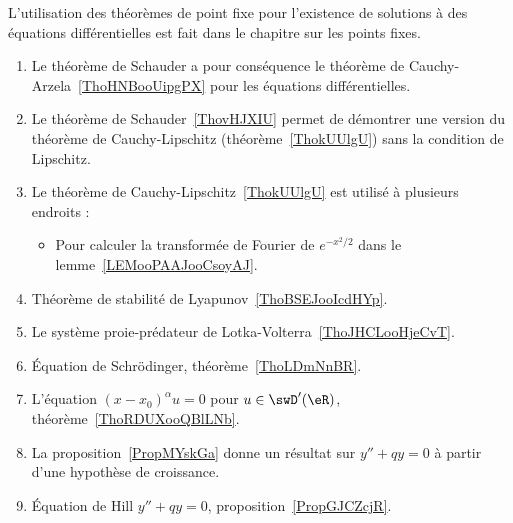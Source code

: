 
	\label{THEMEooEquaDiff}
L'utilisation des théorèmes de point fixe pour l'existence de solutions à des équations différentielles est fait dans le chapitre sur les points fixes.
\begin{enumerate}
	\item
	      Le théorème de Schauder a pour conséquence le théorème de Cauchy-Arzela~\ref{ThoHNBooUipgPX} pour les équations différentielles.
	\item
	      Le théorème de Schauder~\ref{ThovHJXIU} permet de démontrer une version du théorème de Cauchy-Lipschitz (théorème~\ref{ThokUUlgU}) sans la condition de Lipschitz.
	\item
	      Le théorème de Cauchy-Lipschitz~\ref{ThokUUlgU} est utilisé à plusieurs endroits :
	      \begin{itemize}
		      \item
		            Pour calculer la transformée de Fourier de \(  e^{-x^2/2}\) dans le lemme~\ref{LEMooPAAJooCsoyAJ}.
	      \end{itemize}
	\item
	      Théorème de stabilité de Lyapunov~\ref{ThoBSEJooIcdHYp}.
	\item
	      Le système proie-prédateur de Lotka-Volterra~\ref{ThoJHCLooHjeCvT}.
	\item
	      Équation de Schrödinger, théorème~\ref{ThoLDmNnBR}.
	\item
	      L'équation \( (x-x_0)^{\alpha}u=0\) pour \( u\in\swD'(\eR)\), théorème~\ref{ThoRDUXooQBlLNb}.
	\item
	      La proposition~\ref{PropMYskGa} donne un résultat sur \( y''+qy=0\) à partir d'une hypothèse de croissance.
	\item
	      Équation de Hill \( y''+qy=0\), proposition~\ref{PropGJCZcjR}.
\end{enumerate}
